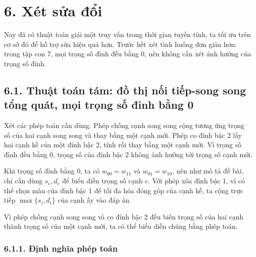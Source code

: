 \documentclass[11pt]{article}
\begin{document}
\section*{6. Xét sửa đổi}

Nay đã có thuật toán giải một truy vấn trong thời gian tuyến tính, ta tối ưu
trên cơ sở đó để hỗ trợ sửa hiệu quả hơn. Trước hết xét tình huống đơn giản
hơn: trong tập con 7, mọi trọng số đỉnh đều bằng 0, nên không cần xét ảnh
hưởng của trọng số đỉnh.

\subsection*{6.1. Thuật toán tám: đồ thị nối tiếp-song song tổng quát, mọi trọng số đỉnh bằng 0}

Xét các phép toán cần dùng. Phép chồng cạnh song song cộng tương ứng trọng số
của hai cạnh song song và thay bằng một cạnh mới. Phép co đỉnh bậc 2 lấy hai
cạnh kề của một đỉnh bậc 2, tính rồi thay bằng một cạnh mới. Vì trọng số đỉnh
đều bằng 0, trọng số của đỉnh bậc 2 không ảnh hưởng tới trọng số cạnh mới.

Khi trọng số đỉnh bằng 0, ta có \(w_{00}=w_{11}\) và \(w_{01}=w_{10}\), nên
như mô tả đề bài, chỉ cần dùng \(s_e,d_e\) để biểu diễn trọng số cạnh \(e\).
Với phép xóa đỉnh bậc 1, vì có thể chọn màu của đỉnh bậc 1 để tối đa hóa đóng
góp của cạnh kề, ta cộng trực tiếp \(\max\{s_i,d_i\}\) của cạnh ấy vào đáp
án.

Vì phép chồng cạnh song song và co đỉnh bậc 2 đều biến trọng số của hai cạnh
thành trọng số của một cạnh mới, ta có thể biểu diễn chúng bằng phép toán.

\subsubsection*{6.1.1. Định nghĩa phép toán}
\end{document}
